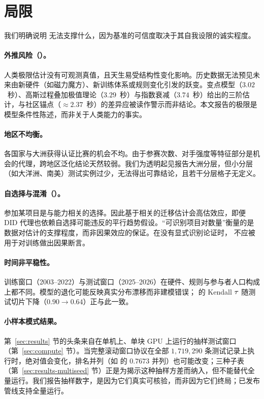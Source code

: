 \section{局限}
\label{sec:limitations}

我们明确说明 \wcabench{} 无法支撑什么，因为基准的可信度取决于其自我设限的诚实程度。

\paragraph{外推风险（）。}人类极限估计没有可观测真值，且天生易受结构性变化影响。历史数据无法预见未来由新硬件（如磁力魔方）、新训练体系或规则变化引发的跃变。变点模型（$3.02$~秒）、高斯过程叠加极值理论（$3.29$~秒）与指数衰减（$3.74$~秒）给出的三阶估计，与社区锚点（$\approx 2.37$~秒）的差异应被读作警示而非结论。本文报告的极限是模型条件性陈述，而非关于人类能力的事实。

\paragraph{地区不均衡。}各国家与大洲获得认证比赛的机会不均。由于参赛次数、对手强度等特征部分是机会的代理，跨地区泛化结论天然较弱。我们为透明起见报告大洲分层，但小分层（如大洋洲、南美）测试实例过少，无法得出可靠结论，且若干分层格子无定义。

\paragraph{自选择与混淆（）。}参加某项目是与能力相关的选择。因此基于相关的迁移估计会高估效应，即便 DID 代理也依赖自选择可能违反的平行趋势假设。“可识别项目对数量”衡量的是数据对估计的支撑程度，而非因果效应的保证。在没有显式识别论证时，\wcabench{} 不应被用于对训练做出因果断言。

\paragraph{时间非平稳性。}训练窗口（2003--2022）与测试窗口（2025--2026）在硬件、规则与参与者人口构成上都不同。模型的退化可能反映真实分布漂移而非建模错误； 的 Kendall $\tau$ 随测试切片下降（$0.90 \to 0.64$）正与此一致。

\paragraph{小样本模式结果。}第~\ref{sec:results} 节的头条来自在单机上、单块 GPU 上运行的抽样测试窗口（第~\ref{sec:compute} 节）。当完整滚动窗口协议在全部 $1{,}719{,}290$ 条测试记录上执行时，绝对值会变化，排名并列（如  的 $0.7673$ 并列）也可能改变；三种子表（第~\ref{sec:results-multiseed} 节）正是为揭示这种抽样方差而纳入，但不能替代全量运行。我们报告抽样数字，是因为它们真实可核验，而非因为它们终局；已发布管线支持全量运行。


